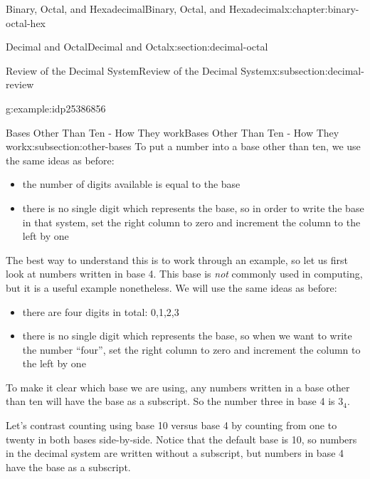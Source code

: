 \documentclass[twoside,10pt,]{book}
\newcommand{\tabularfont}{\relax}
\numberwithin{equation}{section}
\newcommand{\hrulethick} {\noalign{\hrule height 0.11em}}
\begin{document}
\begin{chapterptx}{Binary, Octal, and Hexadecimal}{}{Binary, Octal, and Hexadecimal}{}{}{x:chapter:binary-octal-hex}
\begin{sectionptx}{Decimal and Octal}{}{Decimal and Octal}{}{}{x:section:decimal-octal}
\begin{subsectionptx}{Review of the Decimal System}{}{Review of the Decimal System}{}{}{x:subsection:decimal-review}
\begin{example}{}{g:example:idp25386856}
%
\end{example}
\end{subsectionptx}
%
%
\typeout{************************************************}
\typeout{************************************************}
%
\begin{subsectionptx}{Bases Other Than Ten - How They work}{}{Bases Other Than Ten - How They work}{}{}{x:subsection:other-bases}
To put a number into a base other than ten, we use the same ideas as before: %
\begin{itemize}[label=\textbullet]
\item{}the number of digits available is equal to the base%
\item{}there is no single digit which represents the base, so in order to write the base in that system, set the right column to zero and increment the column to the left by one%
\end{itemize}
%
\par
The best way to understand this is to work through an example, so let us first look at numbers written in base 4.  This base is \emph{not} commonly used in computing, but it is a useful example nonetheless.  We will use the same ideas as before:%
\begin{itemize}[label=\textbullet]
\item{}there are four digits in total:  0,1,2,3%
\item{}there is no single digit which represents the base, so when we want to write the number ``four'', set the right column to zero and increment the column to the left by one%
\end{itemize}
%
\par
To make it clear which base we are using, any numbers written in a base other than ten will have the base as a subscript.  So the number three in base 4 is \(3_4\).%
\par
Let's contrast counting using base 10 versus base 4 by counting from one to twenty in both bases side-by-side.   Notice that the default base is 10, so numbers in the decimal system are written without a subscript, but numbers in base 4 have the base as a subscript.%
\begin{sidebyside}{2}{0.2}{0.2}{0.2}%
\begin{sbspanel}{0.2}%
\resizebox{\ifdim\width > \linewidth\linewidth\else\width\fi}{!}{%
{\centering%
{\tabularfont%
\begin{tabular}{cc}\hrulethick

\end{tabular}}}}
\end{sbspanel}
\end{sidebyside}
\end{subsectionptx}
\end{sectionptx}
\end{chapterptx}
\end{document}
